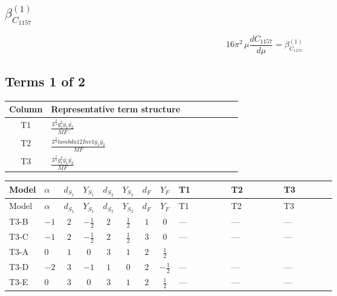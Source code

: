\documentclass[8pt]{article}
\begin{document}
\begin{landscape}
\section*{$\beta_{C_{1157}}^{(1)}$}
\[16\pi^2\,\mu\frac{d C_{1157}}{d\mu}=\beta_{C_{1157}}^{(1)}\]
\subsection*{Terms 1 of 2}
\begin{center}
\begin{tabular}{@{}c >{\raggedright\arraybackslash}p{0.82\linewidth}@{}}
\toprule
Column & Representative term structure \\
\midrule
T1 & \(\displaystyle \frac{3^{\frac{3}{4}} g_{2}^{2} \overline{y_{1}} \overline{y_{2}}}{MF}\) \\
\midrule
T2 & \(\displaystyle \frac{3^{\frac{3}{4}} lambda12Inv1 \overline{y_{1}} \overline{y_{2}}}{MF}\) \\
\midrule
T3 & \(\displaystyle \frac{3^{\frac{3}{4}} g_{1}^{2} \overline{y_{1}} \overline{y_{2}}}{MF}\) \\
\midrule
\bottomrule
\end{tabular}
\end{center}
\smallskip
\tiny
\begin{longtable}{@{}llcccccc >{\raggedright\arraybackslash}p{0.21\linewidth} >{\raggedright\arraybackslash}p{0.21\linewidth} >{\raggedright\arraybackslash}p{0.21\linewidth}@{}}
\toprule
Model & $\alpha$ & $d_{S_1}$ & $Y_{S_1}$ & $d_{S_2}$ & $Y_{S_2}$ & $d_F$ & $Y_F$ & T1 & T2 & T3 \\
\midrule
\endfirsthead
\toprule
Model & $\alpha$ & $d_{S_1}$ & $Y_{S_1}$ & $d_{S_2}$ & $Y_{S_2}$ & $d_F$ & $Y_F$ & T1 & T2 & T3 \\
\midrule
\endhead
T3-B & $-1$ & $2$ & $-\frac{1}{2}$ & $2$ & $\frac{1}{2}$ & $1$ & $0$ & --- & --- & --- \\
\midrule
T3-C & $-1$ & $2$ & $-\frac{1}{2}$ & $2$ & $\frac{1}{2}$ & $3$ & $0$ & --- & --- & --- \\
\midrule
T3-A & $0$ & $1$ & $0$ & $3$ & $1$ & $2$ & $\frac{1}{2}$ & \scriptsize\adjustbox{max width=\linewidth}{$\begin{gathered} - \frac{11 \cdot 3^{\frac{3}{4}} g_{2}^{2} \overline{y_{1}} \overline{y_{2}}}{8 MF}\end{gathered}$} & \scriptsize\adjustbox{max width=\linewidth}{$\begin{gathered} - \frac{3^{\frac{3}{4}} lambda12Inv1 \overline{y_{1}} \overline{y_{2}}}{6 MF}\end{gathered}$} & \scriptsize\adjustbox{max width=\linewidth}{$\begin{gathered} - \frac{3^{\frac{3}{4}} g_{1}^{2} \overline{y_{1}} \overline{y_{2}}}{8 MF}\end{gathered}$} \\
\midrule
T3-D & $-2$ & $3$ & $-1$ & $1$ & $0$ & $2$ & $-\frac{1}{2}$ & --- & --- & --- \\
\midrule
T3-E & $0$ & $3$ & $0$ & $3$ & $1$ & $2$ & $\frac{1}{2}$ & --- & --- & --- \\
\midrule
\bottomrule
\end{longtable}
\clearpage

\end{landscape}
\end{document}
